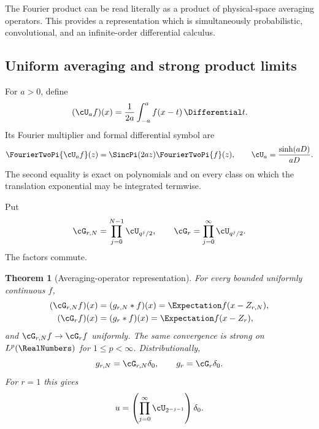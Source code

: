 \documentclass[11pt]{article}
\newtheorem{theorem}{Theorem}[section]
\theoremstyle{definition}
\theoremstyle{remark}
\begin{document}
The Fourier product can be read literally as a product of physical-space
averaging operators.  This provides a representation which is simultaneously
probabilistic, convolutional, and an infinite-order differential calculus.

\subsection{Uniform averaging and strong product limits}

For $a>0$, define
\begin{equation}
 (\cU_af)(x)=\frac1{2a}\int_{-a}^{a}f(x-t)\,\Differential t.         \label{p5:eq:Ua-def}
\end{equation}
Its Fourier multiplier and formal differential symbol are
\begin{equation}
 \FourierTwoPi{\cU_af}(z)=\SincPi(2az)\FourierTwoPi{f}(z),
 \qquad
 \cU_a=\frac{\sinh(aD)}{aD}.                              \label{p5:eq:Ua-symbol}
\end{equation}
The second equality is exact on polynomials and on every class on which the
translation exponential may be integrated termwise.

Put
\begin{equation}
 \cG_{r,N}=\prod_{j=0}^{N-1}\cU_{q^j/2},
 \qquad
 \cG_r=\prod_{j=0}^{\infty}\cU_{q^j/2}.                  \label{p5:eq:Gr-operator}
\end{equation}
The factors commute.

\begin{theorem}[Averaging-operator representation]
\label{p5:thm:averaging-operator}
For every bounded uniformly continuous $f$,
\begin{align}
 (\cG_{r,N}f)(x)&=(g_{r,N}*f)(x)=\Expectation f(x-Z_{r,N}),          \label{p5:eq:GrN-convolution}\\
 (\cG_rf)(x)&=(g_r*f)(x)=\Expectation f(x-Z_r),                     \label{p5:eq:Gr-convolution}
\end{align}
and $\cG_{r,N}f\to\cG_rf$ uniformly.  The same convergence is strong on
$L^p(\RealNumbers)$ for $1\le p<\infty$.  Distributionally,
\begin{equation}
 g_{r,N}=\cG_{r,N}\delta_0,
 \qquad
 g_r=\cG_r\delta_0.                                       \label{p5:eq:g-operator-delta}
\end{equation}
For $r=1$ this gives
\begin{equation}
 u=\left(\prod_{j=0}^{\infty}\cU_{2^{-j-1}}\right)\delta_0. \label{p5:eq:u-averaging-product}
\end{equation}
\end{theorem}
\end{document}
